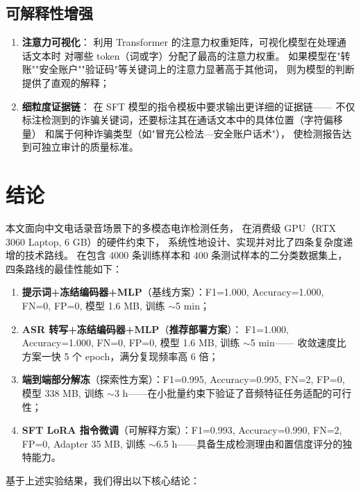\documentclass[11pt,a4paper]{ctexart}
\begin{document}
\subsection{可解释性增强}

\begin{enumerate}[label=(\arabic*)]
  \item \textbf{注意力可视化}：
  利用 Transformer 的注意力权重矩阵，可视化模型在处理通话文本时
  对哪些 token（词或字）分配了最高的注意力权重。
  如果模型在"转账""安全账户""验证码"等关键词上的注意力显著高于其他词，
  则为模型的判断提供了直观的解释；

  \item \textbf{细粒度证据链}：
  在 SFT 模型的指令模板中要求输出更详细的证据链——
  不仅标注检测到的诈骗关键词，还要标注其在通话文本中的具体位置（字符偏移量）
  和属于何种诈骗类型（如"冒充公检法—安全账户话术"），
  使检测报告达到可独立审计的质量标准。
\end{enumerate}

\section{结论}

本文面向中文电话录音场景下的多模态电诈检测任务，
在消费级 GPU（RTX 3060 Laptop, 6 GB）的硬件约束下，
系统性地设计、实现并对比了四条复杂度递增的技术路线。
在包含 4000 条训练样本和 400 条测试样本的二分类数据集上，
四条路线的最佳性能如下：

\begin{enumerate}[label=(\arabic*)]
  \item \textbf{提示词+冻结编码器+MLP}（基线方案）：F1=1.000, Accuracy=1.000, FN=0, FP=0,
  模型 1.6 MB, 训练 $\sim$5 min；
  \item \textbf{ASR 转写+冻结编码器+MLP}（\textbf{推荐部署方案}）：
  F1=1.000, Accuracy=1.000, FN=0, FP=0, 模型 1.6 MB, 训练 $\sim$5 min——
  收敛速度比方案一快 5 个 epoch，满分复现频率高 6 倍；
  \item \textbf{端到端部分解冻}（探索性方案）：F1=0.995, Accuracy=0.995, FN=2, FP=0,
  模型 338 MB, 训练 $\sim$3 h——在小批量约束下验证了音频特征任务适配的可行性；
  \item \textbf{SFT LoRA 指令微调}（可解释方案）：F1=0.993, Accuracy=0.990, FN=2, FP=0,
  Adapter 35 MB, 训练 $\sim$6.5 h——具备生成检测理由和置信度评分的独特能力。
\end{enumerate}

基于上述实验结果，我们得出以下核心结论：
\end{document}
